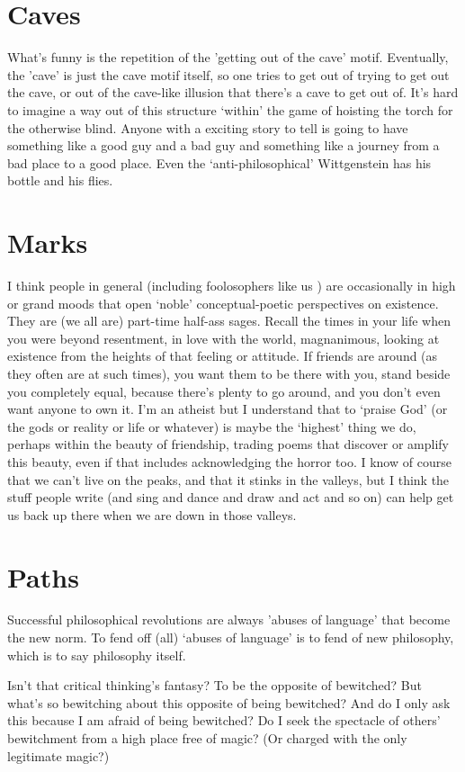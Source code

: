 \documentclass{article}
\begin{document}
\section{Caves} 
What's funny is the repetition of the 'getting out of the cave' motif. Eventually, the 'cave' is just the cave motif itself, so one tries to get out of trying to get out the cave, or out of the cave-like illusion that there's a cave to get out of. It's hard to imagine a way out of this structure `within' the game of hoisting the torch for the otherwise blind. Anyone with a exciting story to tell is going to have something like a good guy and a bad guy and something like a journey from a bad place to a good place. Even the `anti-philosophical' Wittgenstein has his bottle and his flies.

\section{Marks}
I think people in general (including foolosophers like us ) are occasionally in high or grand moods that open `noble' conceptual-poetic perspectives on existence. They are (we all are) part-time half-ass sages. Recall the times in your life when you were beyond resentment, in love with the world, magnanimous, looking at existence from the heights of that feeling or attitude. If friends are around (as they often are at such times), you want them to be there with you, stand beside you completely equal, because there's plenty to go around, and you don't even want anyone to own it. I'm an atheist but I understand that to `praise God' (or the gods or reality or life or whatever) is maybe the `highest' thing we do, perhaps within the beauty of friendship, trading poems that discover or amplify this beauty, even if that includes acknowledging the horror too. I know of course that we can't live on the peaks, and that it stinks in the valleys, but I think the stuff people write (and sing and dance and draw and act and so on) can help get us back up there when we are down in those valleys.

\section{Paths}
Successful philosophical revolutions are always 'abuses of language' that become the new norm. To fend off (all) `abuses of language' is to fend of new philosophy, which is to say philosophy itself.
\newline

Isn't that critical thinking's fantasy? To be the opposite of bewitched? But what's so bewitching about this opposite of being bewitched? And do I only ask this because I am afraid of being bewitched? Do I seek the spectacle of others' bewitchment from a high place free of magic? (Or charged with the only legitimate magic?)
\newline
\end{document}

